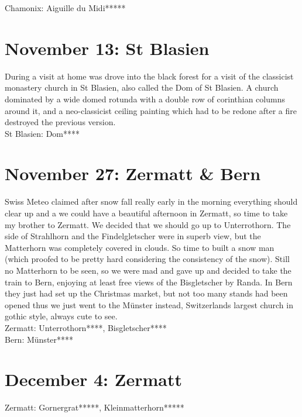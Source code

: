 Chamonix: Aiguille du Midi*****

\section{November 13: St Blasien}
\label{2010StBlasien}

During a visit at home was drove into the black forest for a visit of the classicist monastery church in St Blasien, also called the Dom of St Blasien. A church dominated by a wide domed rotunda with a double row of corinthian columns around it, and a neo-classicist ceiling painting which had to be redone after a fire destroyed the previous version.\\

St Blasien: Dom****

\section{November 27: Zermatt \& Bern}
\label{2010ZermattBern}

Swiss Meteo claimed after snow fall really early in the morning everything should clear up and a we could have a beautiful afternoon in Zermatt, so time to take my brother to Zermatt. We decided that we should go up to Unterrothorn. The side of Strahlhorn and the Findelgletscher were in superb view, but the Matterhorn was completely covered in clouds. So time to built a snow man (which proofed to be pretty hard considering the consistency of the snow). Still no Matterhorn to be seen, so we were mad and gave up and decided to take the train to Bern, enjoying at least free views of the Bisgletscher by Randa. In Bern they just had set up the Christmas market, but not too many stands had been opened thus we just went to the M\"unster instead, Switzerlands largest church in gothic style, always cute to see.\\

Zermatt: Unterrothorn****, Bisgletscher****\\
Bern: M\"unster****

\section{December 4: Zermatt}
\label{2010ZermattII}

Zermatt: Gornergrat*****, Kleinmatterhorn*****